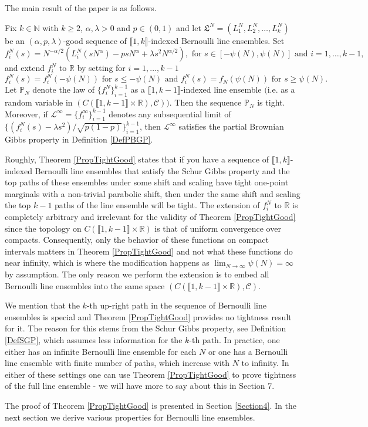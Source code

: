 The main result of the paper is as follows.
\begin{theorem}\label{PropTightGood}
Fix $k \in \mathbb{N}$ with $k \geq 2$, $\alpha, \lambda > 0$ and $p \in (0,1)$ and let $\mathfrak{L}^N = (L^N_1, L^N_2, \dots, L^N_k)$ be an $(\alpha, p, \lambda)$-good sequence of $\llbracket 1, k \rrbracket$-indexed Bernoulli line ensembles.  Set
$$f^N_i(s) =  N^{-\alpha/2}(L^N_i(sN^{\alpha}) - p s N^{\alpha} + \lambda s^2 N^{\alpha/2}), \mbox{ for $s\in [-\psi(N) ,\psi(N)]$ and $i = 1,\dots, k -1$,}$$
and extend $f^N_i$ to $\mathbb{R}$ by setting for $i = 1, \dots, k - 1$
$$f^N_i(s) = f^N_i(-\psi(N)) \mbox{ for $s \leq -\psi(N)$ and } f^N_i(s) = f_N(\psi(N)) \mbox{ for $s \geq \psi(N)$}.$$
Let $\mathbb{P}_N$ denote the law of $\{f^N_i\}_{i = 1}^{k-1}$ as a $\llbracket 1, k-1 \rrbracket$-indexed line ensemble $\mathrm{(}$i.e. as a random variable in $(C( \llbracket 1, k -1 \rrbracket \times \mathbb{R}), \mathcal{C}))$. Then the sequence $\mathbb{P}_N$ is tight. Moreover, if $\mathcal{L}^\infty = \{f_i^{\infty}\}_{i = 1}^{k-1}$ denotes any subsequential limit of $\{(f_i^N(s)-\lambda s^2)/\sqrt{p(1-p)}\}_{i=1}^{k-1}$, then $\mathcal{L}^\infty$ satisfies the partial Brownian Gibbs property in Definition \ref{DefPBGP}.
\end{theorem}

Roughly, Theorem \ref{PropTightGood} states that if you have a sequence of $\llbracket 1, k \rrbracket$-indexed Bernoulli line ensembles that satisfy the Schur Gibbs property and the top paths of these ensembles under some shift and scaling have tight one-point marginals with a non-trivial parabolic shift, then  under the same shift and scaling the top $k-1$ paths of the line ensemble will be tight. The extension of $f^N_i$ to $\mathbb{R}$ is completely arbitrary and irrelevant for the validity of Theorem \ref{PropTightGood} since the topology on $C( \llbracket 1, k -1 \rrbracket \times \mathbb{R})$ is that of uniform convergence over compacts. Consequently, only the behavior of these functions on compact intervals matters in Theorem \ref{PropTightGood} and not what these functions do near infinity, which is where the modification happens as $\lim_{N \rightarrow \infty} \psi(N) = \infty$  by assumption. The only reason we perform the extension is to embed all Bernoulli line ensembles into the same space $(C( \llbracket 1, k -1 \rrbracket \times \mathbb{R}), \mathcal{C})$.

 We mention that the $k$-th up-right path in the sequence of Bernoulli line ensembles is special and Theorem \ref{PropTightGood} provides no tightness result for it. The reason for this stems from the Schur Gibbs property, see Definition \ref{DefSGP}, which assumes less information for the $k$-th path. In practice, one either has an infinite Bernoulli line ensemble for each $N$ or one has a Bernoulli line ensemble with finite number of paths, which increase with $N$ to infinity. In either of these settings one can use Theorem \ref{PropTightGood} to prove tightness of the full line ensemble - we will have more to say about this in Section 7.

The proof of Theorem \ref{PropTightGood} is presented in Section \ref{Section4}. In the next section we derive various properties for Bernoulli line ensembles.







